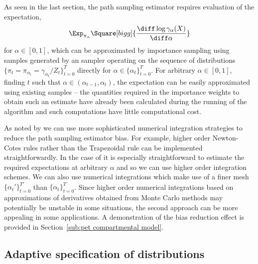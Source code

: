 As seen in the last section, the path sampling estimator requires evaluation of the expectation,
\begin{equation*}
  \Exp_{\pi_\alpha}\Square[bigg]{
    \frac{\diff\log\gamma_{\alpha}(X)}{\diff\alpha}}
\end{equation*}
for $\alpha\in[0,1]$, which can be approximated by importance sampling using samples generated by an \smc sampler operating on the sequence of distributions $\{\pi_t = \pi_{\alpha_t} = \gamma_{\alpha_t}/Z_t\}_{t=0}^T$ directly for $\alpha\in\{\alpha_t\}_{t=0}^T$. For arbitrary $\alpha\in[0,1]$, finding $t$ such that $\alpha\in(\alpha_{t-1},\alpha_t)$, the expectation can be easily approximated using existing \smc samples -- the quantities required in the importance weights to obtain such an estimate have already been calculated during the running of the \smc algorithm and such computations have little computational cost.

As noted by \cite{Friel:2012} we can use more sophisticated numerical integration strategies to reduce the path sampling estimator bias. For example, higher order Newton-Cotes rules rather than the Trapezoidal rule can be implemented straightforwardly. In the case of \smc it is especially straightforward to estimate the required expectations at arbitrary $\alpha$ and so we can use higher order integration schemes. We can also use numerical integrations which make use of a finer mesh $\{\alpha_t'\}_{t=0}^{T'}$ than $\{\alpha_t\}_{t=0}^T$. Since higher order numerical integrations based on approximations of derivatives obtained from Monte Carlo methods may potentially be unstable in some situations, the second approach can be more appealing in some applications. A demonstration of the bias reduction effect is provided in Section~\ref{sub:pet compartmental model}.

\subsection{Adaptive specification of distributions}
\label{sub:Adaptive specification of distributions}

